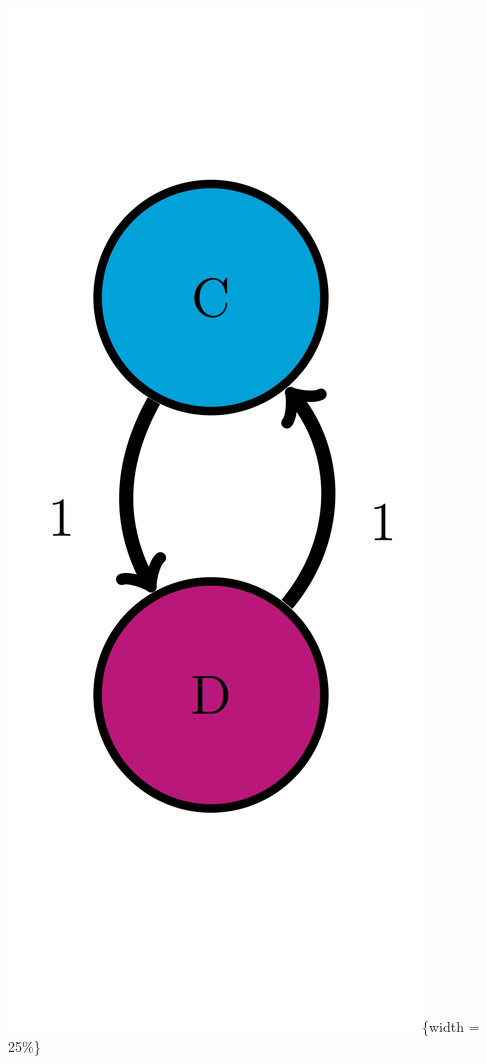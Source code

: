 \documentclass[
  letterpaper,
  DIV=11,
  numbers=noendperiod]{scrreprt}
\begin{document}
\includegraphics{./ch10/CD_trans_diag.png}\{width = 25\%\}
\end{document}

